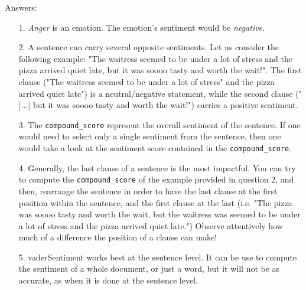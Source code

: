 		Answers:
	\begin{itemize}
		\item [1.] \textit{Anger} is an emotion. The emotion's sentiment would be \textit{negative}.
		\item [2.] A sentence can carry several opposite sentiments. Let us consider the following example: "The waitress seemed to be under a lot of stress and the pizza arrived quiet late, but it was soooo tasty and worth the wait!". The first clause ("The waitress seemed to be under a lot of stress" and the pizza arrived quiet late") is a neutral/negative statement, while the second clause ("[...] but it was soooo tasty and worth the wait!") carries a positive sentiment.
		\item [3.] The \verb|compound_score| represent the overall sentiment of the sentence. If one would need to select only a single sentiment from the sentence, then one would take a look at the sentiment score contained in the \verb|compound_score|.
		\item [4.] Generally, the last clause of a sentence is the most impactful. You can try to compute the \verb|compound_score| of the example provided in question 2, and then, rearrange the sentence in order to have the last clause at the first position within the sentence, and the first clause at the last (i.e. "The pizza was soooo tasty and worth the wait, but the waitress was seemed to be under a lot of stress and the pizza arrived quiet late.") Observe attentively how much of a difference the position of a clause can make!
		\item [5.] vaderSentiment works best at the sentence level. It can be use to compute the sentiment of a whole document, or just a word, but it will not be as accurate, as when it is done at the sentence level.
	\end{itemize}
	
